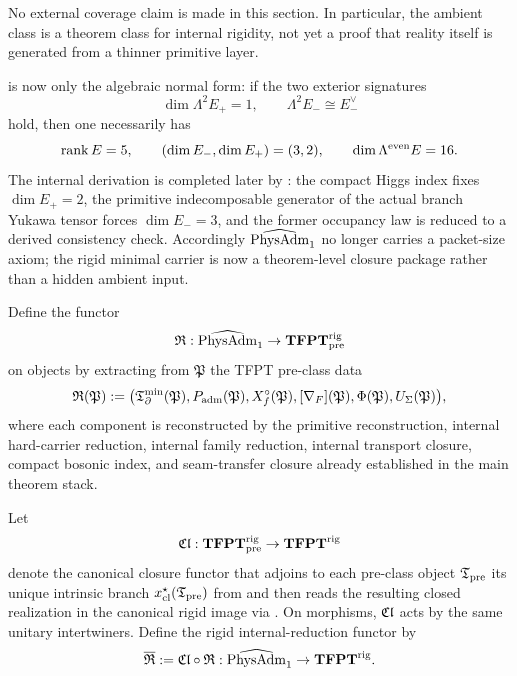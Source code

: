 No external coverage claim is made in this section. In particular, the ambient class is a theorem
class for internal rigidity, not yet a proof that reality itself is generated from a thinner
primitive layer.

\begin{tcolorbox}[colback=orange!5, colframe=orange!70!black, breakable,
    title={Carrier closure is now split cleanly},
    colbacktitle=orange!75!black]
 is now only the algebraic normal form: if the two exterior
signatures
\[
\dim\Lambda^2E_+=1,
\qquad
\Lambda^2E_-\cong E_-^\vee
\]
hold, then one necessarily has
\[
\operatorname{rank} E=5,
\qquad
(\dim E_-,\dim E_+)=(3,2),
\qquad
\dim\Lambda^{\mathrm{even}}E=16.
\]
The internal derivation is completed later by :
the compact Higgs index fixes $\dim E_+=2$, the primitive indecomposable generator of the actual
branch Yukawa tensor forces $\dim E_-=3$, and the former occupancy law is reduced to a derived
consistency check.
Accordingly $\widehat{\mathrm{PhysAdm}}_1$ no longer carries a packet-size axiom; the rigid minimal carrier is now a
theorem-level closure package rather than a hidden ambient input.
\end{tcolorbox}

\begin{definition}
\label{def:universal-reduction}
Define the functor
\[
\mathfrak R:\widehat{\mathrm{PhysAdm}}_1\to \mathbf{TFPT}^{\mathrm{rig}}_{\mathrm{pre}}
\]
on objects by extracting from $\mathfrak P$ the TFPT pre-class data
\[
\mathfrak R(\mathfrak P):=
\bigl(
    \mathfrak T_{\partial}^{\min}(\mathfrak P),
P_{\mathrm{adm}}(\mathfrak P),
X_f^\circ(\mathfrak P),
[\nabla_F](\mathfrak P),
\Phi(\mathfrak P),
U_\Sigma(\mathfrak P)
\bigr),
\]
where each component is reconstructed by the primitive reconstruction, internal hard-carrier
reduction, internal family reduction, internal transport closure, compact bosonic index, and
seam-transfer closure already
established in the main theorem stack.
\end{definition}

\begin{definition}
\label{def:rigid-closure-functor}
Let
\[
\mathfrak{Cl}:\mathbf{TFPT}^{\mathrm{rig}}_{\mathrm{pre}}\to \mathbf{TFPT}^{\mathrm{rig}}
\]
denote the canonical closure functor that adjoins to each pre-class object $\mathfrak T_{\mathrm{pre}}$ its unique
intrinsic branch $x_{\mathrm{cl}}^\star(\mathfrak T_{\mathrm{pre}})$ from  and then reads
the resulting closed realization in the canonical rigid image via
. On morphisms,
$\mathfrak{Cl}$ acts by the same unitary intertwiners. Define the rigid internal-reduction functor by
\[
\overline{\mathfrak R}:=\mathfrak{Cl}\circ \mathfrak R:\widehat{\mathrm{PhysAdm}}_1\to \mathbf{TFPT}^{\mathrm{rig}}.
\]
\end{definition}

